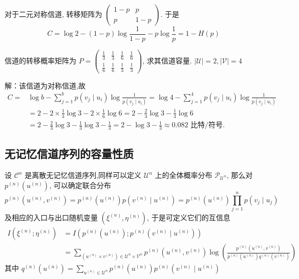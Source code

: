 \begin{example}
 对于二元对称信道, 转移矩阵为 $ \left(\begin{array}{cc}1-p & p \\ p & 1-p\end{array}\right) $.
于是 $$ C=\log 2-(1-p) \log \frac{1}{1-p}-p \log \frac{1}{p} =1-H(p) $$
\end{example}
\begin{example}
    信道的转移概率矩阵为 $ P=\left(\begin{array}{cccc}\frac{1}{3} & \frac{1}{3} & \frac{1}{6} & \frac{1}{6} \\ \frac{1}{6} & \frac{1}{6} & \frac{1}{3} & \frac{1}{3}\end{array}\right) $, 求其信道容量. $ |\mathscr{U}|=2,|\mathscr{V}|=4 $

解：该信道为对称信道,故
$$
\begin{aligned}
C= & \log b-\sum_{j=1}^{b} p\left(v_{j} \mid u_{i}\right) \log \frac{1}{p\left(v_{j} \mid u_{i}\right)}  =\log 4-\sum_{j=1}^{4} p\left(v_{j} \mid u_{i}\right) \log \frac{1}{p\left(v_{j} \mid u_{i}\right)} \\
& =2-2 \times \frac{1}{3} \log 3-2 \times \frac{1}{6} \log 6  =2-\frac{2}{3} \log 3-\frac{1}{3} \log 6 \\
& =2-\frac{2}{3} \log 3-\frac{1}{3} \log 3-\frac{1}{3}  =2-\log 3-\frac{1}{3}  \approx 0.082 \text { 比特/符号. }
\end{aligned}
$$
\end{example}

\subsection{无记忆信道序列的容量性质}
设 $ \mathscr{C}^{n} $ 是离散无记忆信道序列,同样可以定义 $ \mathscr{U}^{n} $ 上的全体概率分布 $ \mathscr{P}_{\mathscr{U}^{n}} $, 那么对 $ p^{(n)}\left(u^{(n)}\right) $, 可以确定联合分布
$$
p^{(n)}\left(u^{(n)}, v^{(n)}\right)=p^{(n)}\left(u^{(n)}\right) p\left(v^{(n)} \mid u^{(n)}\right)=p^{(n)}\left(u^{(n)}\right) \prod_{j=1}^{n} p\left(v_{j} \mid u_{j}\right)
$$
及相应的入口与出口随机变量 $ \left(\xi^{(n)}, \eta^{(n)}\right) $, 于是可定义它们的互信息
$$
\begin{aligned}
I\left(\xi^{(n)} ; \eta^{(n)}\right)&=I\left(p^{(n)}\left(u^{(n)}\right) ; p^{(n)}\left(v^{(n)} \mid u^{(n)}\right)\right) \\
&=\sum_{\left(u^{(n)} \times v^{(n)}\right) \in \mathscr{U}^{n} \times \mathscr{V}^{n}} p^{(n)}\left(u^{(n)}, v^{(n)}\right) \log \left(\frac{p^{(n)}\left(u^{(n)}, v^{(n)}\right)}{p^{(n)}\left(u^{(n)}\right) q^{(n)}\left(v^{(n)}\right)}\right)
\end{aligned}
$$
其中 $q^{(n)}\left(u^{(n)}\right)=\sum\limits_{u^{(n)} \in \mathscr{U}^{n}} p^{(n)}\left(u^{(n)}\right) p^{(n)}\left(v^{(n)} \mid u^{(n)}\right) $


